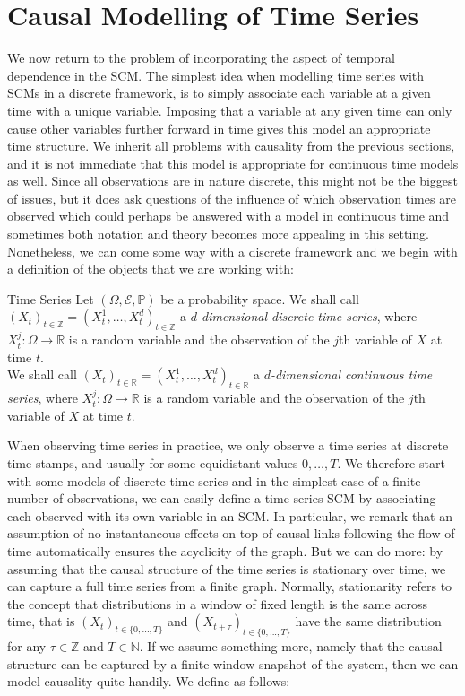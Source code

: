 \documentclass[11pt, a4paper]{memoir}
\theoremstyle{break}
\theoremstyle{break}
\theoremstyle{nonumberplain}
\newcommand{\mN}{\mathbb{N}}
\newcommand{\mZ}{\mathbb{Z}}
\newcommand{\mR}{\mathbb{R}}
\newcommand{\mP}{\mathbb{P}}
\begin{document}
\section{Causal Modelling of Time Series}
We now return to the problem of incorporating the aspect of temporal dependence in the SCM. The simplest idea when modelling time series with SCMs in a discrete framework, is to simply associate each variable at a given time with a unique variable. Imposing that a variable at any given time can only cause other variables further forward in time gives this model an appropriate time structure. We inherit all problems with causality from the previous sections, and it is not immediate that this model is appropriate for continuous time models as well. Since all observations are in nature discrete, this might not be the biggest of issues, but it does ask questions of the influence of which observation times are observed which could perhaps be answered with a model in continuous time and sometimes both notation and theory becomes more appealing in this setting. Nonetheless, we can come some way with a discrete framework and we begin with a definition of the objects that we are working with:
\begin{mydefinition}{Time Series}
Let $(\Omega,\mathcal{E},\mP)$ be a probability space. We shall call $(X_t)_{t\in \mZ}=(X_t^{1},\ldots,X_{t}^d)_{t\in \mZ}$ a \emph{$d$-dimensional discrete time series}, where $X_t^j:\Omega\to \mR$ is a random variable and the observation of the $j$th variable of $X$ at time $t$.\\[5pt]
We shall call $(X_t)_{t\in \mR}=(X_t^{1},\ldots,X_{t}^d)_{t\in \mR}$ a \emph{$d$-dimensional continuous time series}, where $X_t^j:\Omega\to \mR$ is a random variable and the observation of the $j$th variable of $X$ at time $t$.
\end{mydefinition}
\noindent When observing time series in practice, we only observe a time series at discrete time stamps, and usually for some equidistant values $0,\ldots, T$. We therefore start with some models of discrete time series and in the simplest case of a finite number of observations, we can easily define a time series SCM by associating each observed with its own variable in an SCM. In particular, we remark that an assumption of no instantaneous effects on top of causal links following the flow of time automatically ensures the acyclicity of the graph. But we can do more: by assuming that the causal structure of the time series is stationary over time, we can capture a full time series from a finite graph. Normally, stationarity refers to the concept that distributions in a window of fixed length is the same across time, that is $(X_t)_{t\in \{0,...,T\}}$ and $(X_{t+\tau})_{t\in \{0,...,T\}}$ have the same distribution for any $\tau\in \mZ$ and $T\in \mN$. If we assume something more, namely that the causal structure can be captured by a finite window snapshot of the system, then we can model causality quite handily. We define as follows:
\end{document}
